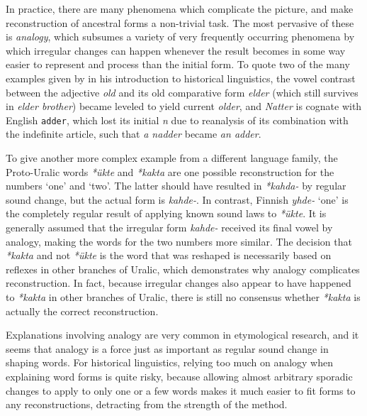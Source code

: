In practice, there are many phenomena which complicate the picture, and make reconstruction of ancestral forms a non-trivial task. The most pervasive of these is \textit{analogy}, which subsumes a variety of very frequently occurring phenomena by which irregular changes can happen whenever the result becomes in some way easier to represent and process than the initial form. To quote two of the many examples given by \cite{campbell1999} in his introduction to historical linguistics, the vowel contrast between the  adjective \textit{old} and its old comparative form \textit{elder} (which still survives in \textit{elder brother}) became leveled to yield current \textit{older}, and  \textit{Natter} is cognate with English \texttt{adder}, which lost its initial \textit{n} due to reanalysis of its combination with the indefinite article, such that \textit{a nadder} became \textit{an adder}.

To give another more complex example from a different language family, the Proto-Uralic words \textit{*ükte} and \textit{*kakta} are one possible reconstruction for the numbers `one' and `two'. The latter should have resulted in  \textit{*kahda-} by regular sound change, but the actual form is \textit{kahde-}. In contrast, Finnish \textit{yhde-} `one' is the completely regular result of applying known sound laws to \textit{*ükte}. It is generally assumed that the irregular form \textit{kahde-} received its final vowel by analogy, making the words for the two numbers more similar. The decision that \textit{*kakta} and not \textit{*ükte} is the word that was reshaped is necessarily based on reflexes in other branches of Uralic, which demonstrates why analogy complicates reconstruction. In fact, because irregular changes also appear to have happened to \textit{*kakta} in other branches of Uralic, there is still no consensus whether \textit{*kakta} is actually the correct 
reconstruction.

Explanations involving analogy are very common in etymological research, and it seems that analogy is a force just as important as regular sound change in shaping words. For historical linguistics, relying too much on analogy when explaining word forms is quite risky, because allowing almost arbitrary sporadic changes to apply to only one or a few words makes it much easier to fit forms to any reconstructions, detracting from the strength of the method.

